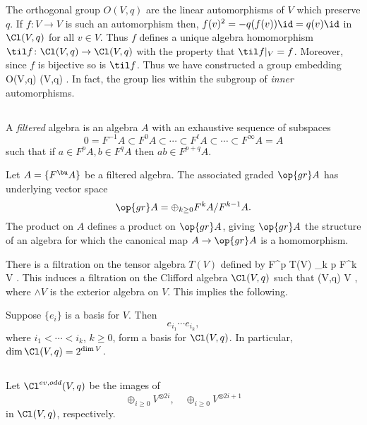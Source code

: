 \documentclass[../main.tex]{subfiles}
\begin{document}
The orthogonal group $O(V,q)$ are the linear automorphisms of $V$ which preserve $q$.
If $f \colon V \to V$ is such an automorphism then, $f(v)^2 = - q(f(v)) \id = q(v) \id$ in $\Cl(V,q)$ for all $v \in V$.
Thus $f$ defines a unique algebra homomorphism $\til f \colon \Cl(V,q) \to \Cl(V,q)$ with the property that $\til f|_V = f$.
Moreover, since $f$ is bijective so is $\til f$.
Thus we have constructed a group embedding
\beqn
O(V,q) \hookrightarrow {} \Cl(V,q) .
\eeqn
In fact, the group lies within the subgroup of \textit{inner} automorphisms.


\subsection{}

A \textit{filtered} algebra is an algebra $A$ with an exhaustive sequence of subspaces
\[
0 = F^{-1} A \subset F^0 A \subset \cdots \subset F^\ell A \subset \cdots \subset F^\infty A = A 
\]
such that if $a \in F^p A, b \in F^q A$ then $ab \in F^{p+q} A$.

Let $A = \{F^\bu A\}$ be a filtered algebra.
The associated graded $\op{gr} A$ has underlying vector space
\[
\op{gr} A = \oplus_{k \geq 0} F^{k} A \slash F^{k-1} A .
\]
The product on $A$ defines a product on $\op{gr} A$, giving $\op{gr} A$ the structure of an algebra for which the canonical map $A \to \op{gr} A$ is a homomorphism.

There is a filtration on the tensor algebra $T(V)$ defined by 
\beqn
F^p T(V)  \oplus_{k \leq p} F^k V .
\eeqn
This induces a filtration on the Clifford algebra $\Cl(V,q)$ such that
\beqn
{} \Cl(V,q) \cong \wedge V ,
\eeqn
where $\wedge V$ is the exterior algebra on $V$.
This implies the following.

\begin{lem}
Suppose $\{e_i\}$ is a basis for $V$.
Then 
\[
e_{i_1} \cdots e_{i_k},
\]
where $i_1 < \cdots < i_k$, $k \geq 0$, form a basis for $\Cl(V,q)$.
In particular, $\dim \Cl(V,q) = 2^{\dim V}$.
\end{lem}

\subsection{}

Let $\Cl^{ev,odd}(V,q)$ be the images of
\[
\oplus_{i \geq 0} V^{\otimes 2i} , \quad \oplus_{i \geq 0} V^{\otimes 2i+1}
\]
in $\Cl(V,q)$, respectively.
\end{document}
